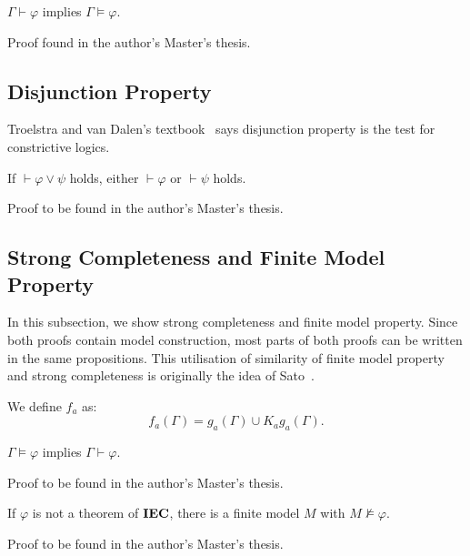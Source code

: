   \begin{proposition}[Soundness]
   \label{soundness}
   $\Gamma\vdash\varphi$ implies $\Gamma\models\varphi$.
  \end{proposition}
  Proof found in the author's Master's thesis.

  \subsection{Disjunction Property}

  Troelstra and van Dalen's
  textbook~\cite[3.5]{troelstra1988constructivism} says
  disjunction property is the test for constrictive logics.

   \begin{proposition}
    \label{disjunction-property}
    If $\vdash\varphi\vee\psi$ holds, either $\vdash\varphi$ or $\vdash\psi$ holds.
   \end{proposition}
   Proof to be found in the author's Master's thesis.

  \subsection{Strong Completeness and Finite Model Property}

  In this subsection, we show strong completeness and finite model property.
  Since both proofs contain model construction,
  most parts of both proofs can be written in the same propositions.
  This utilisation of similarity of finite model property and strong completeness
  is originally the idea of
  Sato~\cite{sato13study}.

  \begin{definition}
   We define $f_a$ as:
   \[
   f_a(\Gamma) = g_a(\Gamma) \cup K_ag_a(\Gamma).
   \]
  \end{definition}

  \newcommand{\natpls}{{\mathbb N}^{+}}

\begin{proposition}
 \label{strong-completeness}
 $\Gamma\models\varphi$ implies $\Gamma\vdash\varphi$.
\end{proposition}
Proof to be found in the author's Master's thesis.

\begin{proposition}
 \label{fmp}
 If $\varphi$ is not a theorem of ${\rm {\textbf{IEC}}}$,
 there is a finite model $M$ with $M\not\models\varphi$.
\end{proposition}
Proof to be found in the author's Master's thesis.

